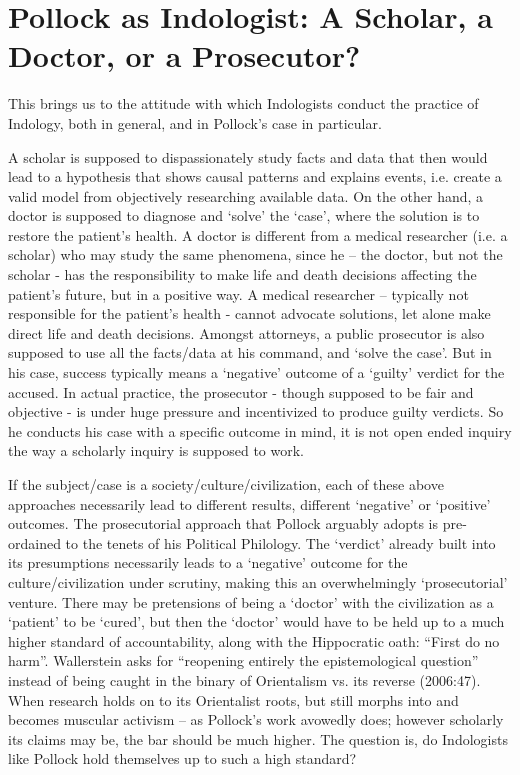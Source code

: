 \section*{Pollock as Indologist: A Scholar, a Doctor, or a Prosecutor?}

This brings us to the attitude with which Indologists conduct the practice of Indology, both in general, and in Pollock’s case in particular.

A scholar is supposed to dispassionately study facts and data that then would lead to a hypothesis that shows causal patterns and explains events, i.e. create a valid model from objectively researching available data. On the other hand, a doctor is supposed to diagnose and ‘solve’ the ‘case’, where the solution is to restore the patient’s health. A doctor is different from a medical researcher (i.e. a scholar) who may study the same phenomena, since he – the doctor, but not the scholar - has the responsibility to make life and death decisions affecting the patient’s future, but in a positive way. A medical researcher – typically not responsible for the patient’s health - cannot advocate solutions, let alone make direct life and death decisions. Amongst attorneys, a public prosecutor is also supposed to use all the facts/data at his command, and ‘solve the case’. But in his case, success typically means a ‘negative’ outcome of a ‘guilty’ verdict for the accused. In actual practice, the prosecutor - though supposed to be fair and objective - is under huge pressure and incentivized to produce guilty verdicts. So he conducts his case with a specific outcome in mind, it is not open ended inquiry the way a scholarly inquiry is supposed to work.

If the subject/case is a society/culture/civilization, each of these above approaches necessarily lead to different results, different ‘negative’ or ‘positive’ outcomes. The prosecutorial approach that Pollock arguably adopts is pre-ordained to the tenets of his Political Philology. The ‘verdict’ already built into its presumptions necessarily leads to a ‘negative’ outcome for the culture/civilization under scrutiny, making this an overwhelmingly ‘prosecutorial’ venture. There may be pretensions of being a ‘doctor’ with the civilization as a ‘patient’ to be ‘cured’, but then the ‘doctor’ would have to be held up to a much higher standard of accountability, along with the Hippocratic oath: “First do no harm”. Wallerstein asks for “reopening entirely the epistemological question” instead of being caught in the binary of Orientalism vs. its reverse (2006:47). When research holds on to its Orientalist roots, but still morphs into and becomes muscular activism – as Pollock’s work avowedly does; however scholarly its claims may be, the bar should be much higher. The question is, do Indologists like Pollock hold themselves up to such a high standard?

